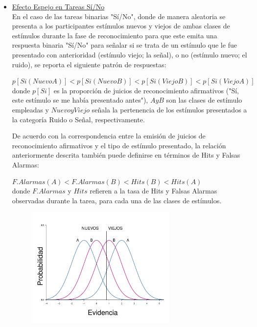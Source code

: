\begin{itemize}
\item \underline{Efecto Espejo en Tareas Sí/No}\\

En el caso de las tareas binarias "Sí/No", donde de manera aleatoria se presenta a los participantes estímulos nuevos y viejos de ambas clases de estímulos durante la fase de reconocimiento para que este emita una respuesta binaria "Sí/No" para señalar si se trata de un estímulo que le fue presentado con anterioridad (estímulo viejo; la señal), o no (estímulo nuevo; el ruido), se reporta el siguiente patrón de respuestas:\\

\begin{center}
$p[Si(NuevoA)] < p[Si(NuevoB)] < p[Si(ViejoB)] < p[Si(ViejoA)]$\\

donde $p[Si]$ es la proporción de juicios de reconocimiento afirmativos ("Sí, este estímulo se me había presentado antes"), $A y B$ son las clases de estímulo empleadas y $Nuevo y Viejo$ señala la pertenencia de los estímulos presentados a la categoría Ruido o Señal, respectivamente.\\
\end{center}

De acuerdo con la correspondencia entre la emisión de juicios de reconocimiento afirmativos y el tipo de estímulo presentado, la relación anteriormente descrita también puede definirse en términos de Hits y Falsas Alarmas:\\

\begin{center}
$F.Alarmas(A) < F.Alarmas(B) < Hits(B) < Hits(A)$\\

donde $F.Alarmas$ y $Hits$ refieren a la tasa de Hits y Falsas Alarmas observadas durante la tarea, para cada una de las clases de estímulos.\\
\end{center}



\begin{figure}[th]
\centering
\includegraphics[width=0.7\textwidth]{Figures/EfectoEspejo_YesNo}
\caption[Representación gráfica del Efecto Espejo]{}
\label{fig:Ejem_Espejo_YesNo}
\end{figure}




\end{itemize}
